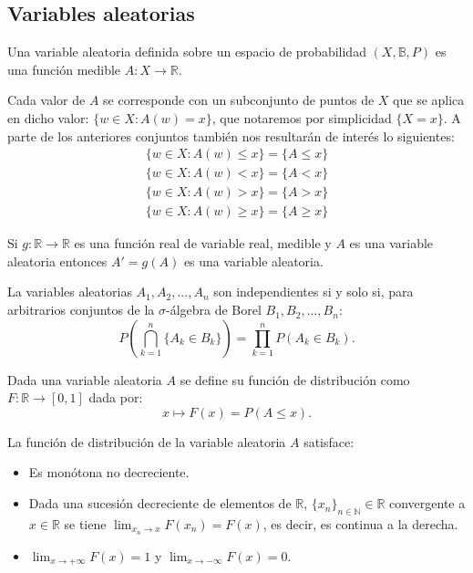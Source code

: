 \documentclass[../proyecto.tex]{memoir}
\begin{document}
\subsection{Variables aleatorias}

\begin{defi}
Una variable aleatoria definida sobre un espacio de probabilidad $(X, \mathds{B}, P)$ es una función medible $A: X \to \mathds{R}$.
\end{defi}

Cada valor de $A$ se corresponde con un subconjunto de puntos de $X$ que se aplica en dicho valor: $\{ w\in X : A(w)=x\}$, que notaremos por simplicidad $\{X = x\}$. A parte de los anteriores conjuntos también nos resultarán de interés lo siguientes:
\begin{align*}
\{ w\in X : A(w) \leq x\} = \{ A \leq x \} \\
\{ w\in X : A(w) < x\} = \{ A < x \} \\
\{ w\in X : A(w) > x\} = \{ A > x \} \\
\{ w\in X : A(w) \geq x\} = \{ A \geq x \}
\end{align*}

\begin{prop} \label{funcion_de_va}
Si $g:\mathds{R}\to\mathds{R}$ es una función real de variable real, medible y $A$ es una variable aleatoria entonces $A'=g(A)$ es una variable aleatoria.
\end{prop}

\begin{defi}
La variables aleatorias $A_1, A_2,..., A_n$ son independientes si y solo si, para arbitrarios conjuntos de la $\sigma$-álgebra de Borel $B_1, B_2,..., B_n$: $$
	P \left( \bigcap_{k = 1}^{n} \{A_k \in B_k\} \right) = \prod_{k = 1}^{n} P(A_k \in B_k).
$$
\end{defi}

\begin{defi}
Dada una variable aleatoria $A$ se define su función de distribución como $ F : \mathds{R} \to [0,1] $ dada por:
$$
x \mapsto F(x)=P(A \leq x).
$$
\end{defi}

\begin{prop}
La función de distribución de la variable aleatoria $A$ satisface:
\begin{itemize}
\item Es monótona no decreciente.
\item Dada una sucesión decreciente de elementos de $\mathds{R}$, $\{x_n\}_{n \in \mathds{N}} \in \mathds{R}$ convergente a $x\in \mathds{R}$ se tiene $\lim_{x_n \to x} F(x_n) = F(x)$, es decir, es continua a la derecha.
\item $\lim_{x\to+\infty} F(x) = 1$ y $\lim_{x\to-\infty} F(x) = 0$.
\end{itemize}
\end{prop}
\end{document}
